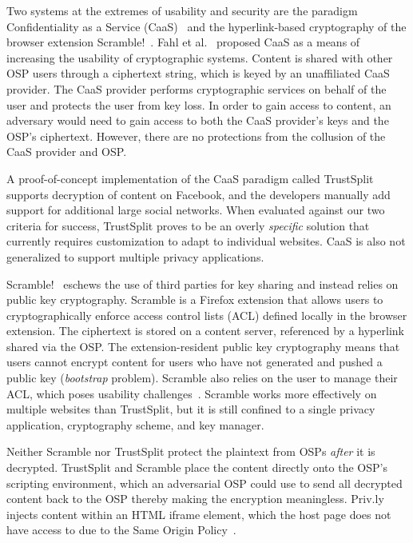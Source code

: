 \documentclass[letterpaper,twocolumn,10pt]{article}
\begin{document}
Two systems at the extremes of usability and security are the paradigm Confidentiality as a Service (CaaS)~\cite{Fahl2012b} 
and the hyperlink-based cryptography of the browser extension 
Scramble!~\cite{Beato2011}. Fahl et al.~\cite{Fahl2012b} proposed CaaS as a means 
of increasing the usability of cryptographic systems. Content is shared with other 
OSP users through a ciphertext string, which is keyed by an unaffiliated CaaS 
provider. The CaaS provider performs cryptographic services on behalf of the user 
and protects the user from key loss. In order to gain access to content, an 
adversary would need to gain access to both the CaaS provider's keys and the OSP's 
ciphertext. However, there are no protections from the collusion of the CaaS 
provider and OSP.

A proof-of-concept implementation of the CaaS paradigm called 
TrustSplit~\cite{Fahl2012a} supports decryption of content on Facebook, and the 
developers manually add support for additional large social networks. When 
evaluated against our two criteria for success, TrustSplit proves to be an 
overly \emph{specific} solution that currently requires customization to adapt to individual 
websites. CaaS is also not generalized to support
multiple privacy applications.

Scramble!~\cite{Beato2011} eschews the use of third parties for key sharing and instead relies on public key cryptography. 
Scramble is a Firefox extension that allows users to cryptographically enforce
access control lists (ACL) defined locally in the browser extension.
The ciphertext is stored on a content server, referenced by a hyperlink shared via 
the OSP. The extension-resident public key cryptography means that users cannot 
encrypt content for users who have not generated and pushed a public key 
(\emph{bootstrap} problem). Scramble also relies on the user to manage their ACL, 
which poses usability challenges~\cite{Fahl2012}. Scramble works more 
effectively on multiple websites than TrustSplit, but it is still confined
to a single privacy application, cryptography scheme, and key manager.

Neither Scramble nor TrustSplit protect the plaintext from OSPs \emph{after} it is 
decrypted. TrustSplit and Scramble place the content directly onto the OSP's 
scripting environment, which an adversarial OSP could use to send all decrypted 
content back to the OSP thereby making the encryption meaningless. Priv.ly injects 
content within an HTML iframe element, which the host page does not have access to 
due to the Same Origin Policy~\cite{Barth2009}.
\end{document}
